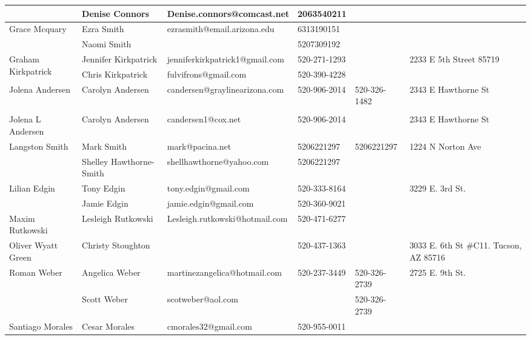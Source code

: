 \documentclass[landscape]{article}\usepackage[]{graphicx}\usepackage[]{color}
\begin{document}
\begin{longtable}{|p{100pt}|p{100pt}|p{140pt}|p{60pt}|p{64pt}|p{120pt}|}
 & Denise Connors & Denise.connors@comcast.net & 2063540211 &  & \\
\hline
\multirow{2}{100pt}{Grace Mcquary} & Ezra Smith & ezrasmith@email.arizona.edu & 6313190151 &  & \multirow{2}{120pt}{} \\
 & Naomi Smith &  & 5207309192 &  & \\
\hline
\multirow{2}{100pt}{Graham Kirkpatrick} & Jennifer Kirkpatrick & jenniferkirkpatrick1@gmail.com & 520-271-1293 &  & \multirow{2}{120pt}{2233 E 5th Street 85719} \\
 & Chris Kirkpatrick & fulvifrons@gmail.com & 520-390-4228 &  & \\
\hline
\multirow{2}{100pt}{Jolena Andersen} & Carolyn Andersen & candersen@graylinearizona.com & 520-906-2014 & 520-326-1482 & \multirow{2}{120pt}{2343 E Hawthorne St} \\
 &  &  &  &  & \\
\hline
\multirow{2}{100pt}{Jolena L Andersen} & Carolyn Andersen & candersen1@cox.net & 520-906-2014 &  & \multirow{2}{120pt}{2343 E Hawthorne St} \\
 &  &  &  &  & \\
\hline
\multirow{2}{100pt}{Langston Smith} & Mark Smith & mark@pacina.net & 5206221297 & 5206221297 & \multirow{2}{120pt}{1224 N Norton Ave} \\
 & Shelley Hawthorne-Smith & shellhawthorne@yahoo.com & 5206221297 &  & \\
\hline
\multirow{2}{100pt}{Lilian Edgin} & Tony Edgin & tony.edgin@gmail.com & 520-333-8164 &  & \multirow{2}{120pt}{3229 E. 3rd St.} \\
 & Jamie Edgin & jamie.edgin@gmail.com & 520-360-9021 &  & \\
\hline
\multirow{2}{100pt}{Maxim Rutkowski } & Lesleigh Rutkowski  & Lesleigh.rutkowski@hotmail.com & 520-471-6277 &  & \multirow{2}{120pt}{} \\
 &  &  &  &  & \\
\hline
\multirow{2}{100pt}{Oliver Wyatt Green} & Christy Stoughton &  & 520-437-1363 &  & \multirow{2}{120pt}{3033 E. 6th St \#C11. Tucson, AZ 85716} \\
 &  &  &  &  & \\
\hline
\multirow{2}{100pt}{Roman Weber} & Angelica Weber & martinezangelica@hotmail.com & 520-237-3449 & 520-326-2739 & \multirow{2}{120pt}{2725 E. 9th St.} \\
 & Scott Weber & scotweber@aol.com &  & 520-326-2739 & \\
\hline
\multirow{2}{100pt}{Santiago Morales } & Cesar Morales & cmorales32@gmail.com & 520-955-0011 &  & \multirow{2}{120pt}{} \\

\end{longtable}
\end{document}
